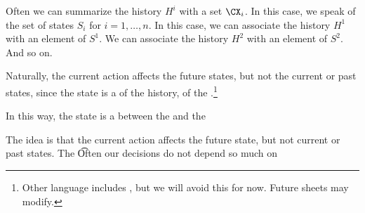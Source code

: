 
Often we can summarize the history $H^i$ with a set $\CX_i$.
In this case, we speak of the set of states $S_i$ for $i = 1, \dots, n$.
In this case, we can associate the history $H^1$ with an element of $S^1$.
We can associate the history $H^2$ with an element of $S^2$.
And so on.

Naturally, the current action affects the future states, but not the current or past states, since the state is a  of the history, of the .\footnote{Other language includes , but we will avoid this for now. Future sheets may modify.}


In this way, the state is a  between the  and the 

The idea is that the current action affects the future state, but not current or past states.
The \t
Often our decisions do not depend so much on


%
%
%
%
